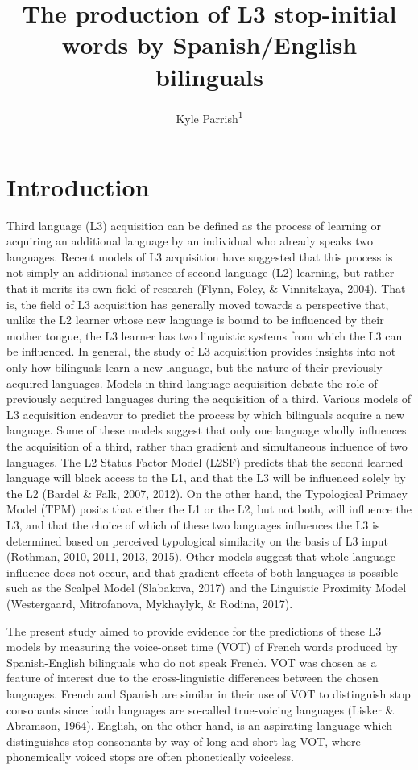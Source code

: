 \documentclass[
  english,
  man]{apa6}
\title{The production of L3 stop-initial words by Spanish/English bilinguals}
\author{Kyle Parrish\textsuperscript{1}}
\date{}
\affiliation{\vspace{0.5cm}\textsuperscript{1} Rutgers University}
\begin{document}
\maketitle

\hypertarget{introduction}{%
\section{Introduction}\label{introduction}}

Third language (L3) acquisition can be defined as the process of learning or acquiring an additional language by an individual who already speaks two languages.
Recent models of L3 acquisition have suggested that this process is not simply an additional instance of second language (L2) learning, but rather that it merits its own field of research (Flynn, Foley, \& Vinnitskaya, 2004).
That is, the field of L3 acquisition has generally moved towards a perspective that, unlike the L2 learner whose new language is bound to be influenced by their mother tongue, the L3 learner has two linguistic systems from which the L3 can be influenced.
In general, the study of L3 acquisition provides insights into not only how bilinguals learn a new language, but the nature of their previously acquired languages.
Models in third language acquisition debate the role of previously acquired languages during the acquisition of a third.
Various models of L3 acquisition endeavor to predict the process by which bilinguals acquire a new language.
Some of these models suggest that only one language wholly influences the acquisition of a third, rather than gradient and simultaneous influence of two languages.
The L2 Status Factor Model (L2SF) predicts that the second learned language will block access to the L1, and that the L3 will be influenced solely by the L2 (Bardel \& Falk, 2007, 2012).
On the other hand, the Typological Primacy Model (TPM) posits that either the L1 or the L2, but not both, will influence the L3, and that the choice of which of these two languages influences the L3 is determined based on perceived typological similarity on the basis of L3 input (Rothman, 2010, 2011, 2013, 2015).
Other models suggest that whole language influence does not occur, and that gradient effects of both languages is possible such as the Scalpel Model (Slabakova, 2017) and the Linguistic Proximity Model (Westergaard, Mitrofanova, Mykhaylyk, \& Rodina, 2017).

The present study aimed to provide evidence for the predictions of these L3 models by measuring the voice-onset time (VOT) of French words produced by Spanish-English bilinguals who do not speak French. VOT was chosen as a feature of interest due to the cross-linguistic differences between the chosen languages.
French and Spanish are similar in their use of VOT to distinguish stop consonants since both languages are so-called true-voicing languages (Lisker \& Abramson, 1964).
English, on the other hand, is an aspirating language which distinguishes stop consonants by way of long and short lag VOT, where phonemically voiced stops are often phonetically voiceless.
\end{document}
